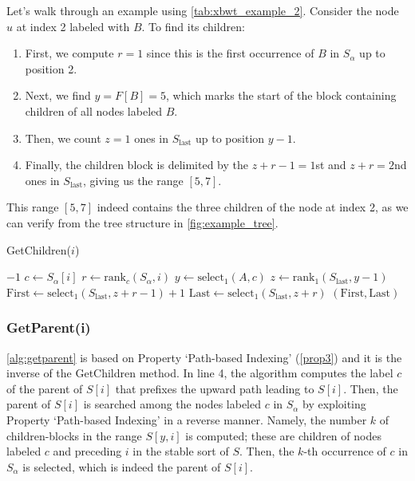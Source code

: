 \begin{example}
    Let's walk through an example using \cref{tab:xbwt_example_2}. Consider the node $u$ at index 2 labeled with $B$. To find its children:

    \begin{enumerate}
        \item First, we compute $r = 1$ since this is the first occurrence of $B$ in $S_{\alpha}$ up to position 2.
        \item Next, we find $y = F[B] = 5$, which marks the start of the block containing children of all nodes labeled $B$.
        \item Then, we count $z = 1$ ones in $S_{\text{last}}$ up to position $y-1$.
        \item Finally, the children block is delimited by the $z+r-1 = 1$st and $z+r = 2$nd ones in $S_{\text{last}}$, giving us the range $[5,7]$.
    \end{enumerate}

    This range $[5,7]$ indeed contains the three children of the node at index 2, as we can verify from the tree structure in \cref{fig:example_tree}.
\end{example}

\begin{algorithm}[H] 
    \caption{GetChildren($i$)}
    \label{alg:getchildren}
    \begin{algorithmic}[1]
        \State \Return $-1$ 
    \EndIf
    \State $c \gets S_\alpha[i]$ 
    \State $r \gets \text{rank}_c(S_\alpha, i)$
    \State $y \gets \text{select}_1(A, c)$ 
    \State $z \gets \text{rank}_1(S_{\text{last}}, y - 1)$
    \State $\text{First} \gets \text{select}_1(S_{\text{last}}, z + r - 1) + 1$
    \State $\text{Last} \gets \text{select}_1(S_{\text{last}}, z + r)$
    \State \Return $(\text{First}, \text{Last})$
    \end{algorithmic}
\end{algorithm}

\subsubsection*{GetParent(i)}
\cref{alg:getparent} is based on Property `Path-based Indexing' (\cref{prop3}) and it is the inverse of the GetChildren method. In line 4, the algorithm computes the label $c$ of the parent of $S[i]$ that prefixes the upward path leading to $S[i]$. Then, the parent of $S[i]$ is searched among the nodes labeled $c$ in $S_{\alpha}$ by exploiting Property `Path-based Indexing' in a reverse manner. Namely, the number $k$ of children-blocks in the range $S[y, i]$ is computed; these are children of nodes labeled $c$ and preceding $i$ in the stable sort of $S$. Then, the $k$-th occurrence of $c$ in $S_{\alpha}$ is selected, which is indeed the parent of $S[i]$.

